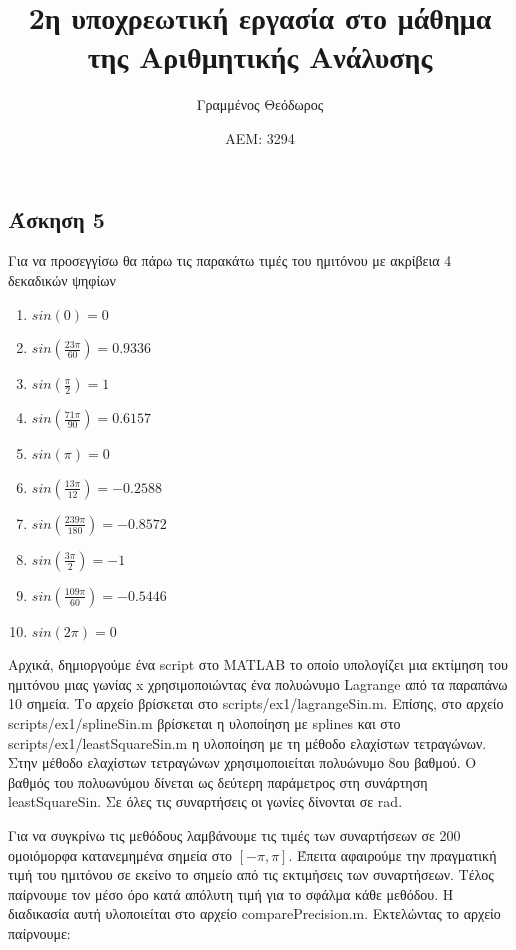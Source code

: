 \documentclass[12pt,a4paper]{article}
\author{Γραμμένος Θεόδωρος}
\title{2η υποχρεωτική εργασία στο μάθημα της Αριθμητικής Ανάλυσης}
\date{ΑΕΜ: 3294}
\begin{document}
\maketitle
\subsection*{Άσκηση 5}
Για να προσεγγίσω θα πάρω τις παρακάτω τιμές του ημιτόνου με ακρίβεια 4 δεκαδικών ψηφίων
\begin{enumerate}
    \item $sin(0) = 0$
    \item $sin(\frac{23\pi}{60}) = 0.9336$
    \item $sin(\frac{\pi}{2}) = 1$
    \item $sin(\frac{71\pi}{90}) = 0.6157$
    \item $sin(\pi) = 0$
    \item $sin(\frac{13\pi}{12}) = -0.2588$
    \item $sin(\frac{239\pi}{180}) = -0.8572$
    \item $sin(\frac{3\pi}{2}) = -1$
    \item $sin(\frac{109\pi}{60}) = -0.5446$
    \item $sin(2\pi) = 0$
\end{enumerate}
Αρχικά, δημιοργούμε ένα script στο MATLAB το οποίο υπολογίζει μια εκτίμηση του ημιτόνου μιας γωνίας x χρησιμοποιώντας 
ένα πολυώνυμο Lagrange από τα παραπάνω 10 σημεία. Το αρχείο βρίσκεται στο scripts/ex1/lagrangeSin.m. Επίσης, στο αρχείο 
scripts/ex1/splineSin.m βρίσκεται η υλοποίηση με splines και στο scripts/ex1/leastSquareSin.m η υλοποίηση με τη μέθοδο ελαχίστων 
τετραγώνων. Στην μέθοδο ελαχίστων τετραγώνων χρησιμοποιείται πολυώνυμο 8ου βαθμού. Ο βαθμός του πολυωνύμου δίνεται ως δεύτερη 
παράμετρος στη συνάρτηση leastSquareSin. Σε όλες τις συναρτήσεις οι γωνίες δίνονται σε rad.\par
Για να συγκρίνω τις μεθόδους λαμβάνουμε τις τιμές των συναρτήσεων σε 200 ομοιόμορφα κατανεμημένα σημεία στο $[-\pi,\pi]$. Έπειτα 
αφαιρούμε την πραγματική τιμή του ημιτόνου σε εκείνο το σημείο από τις εκτιμήσεις των συναρτήσεων. Τέλος παίρνουμε τον μέσο όρο κατά 
απόλυτη τιμή για το σφάλμα κάθε μεθόδου. Η διαδικασία αυτή υλοποιείται στο αρχείο comparePrecision.m. Εκτελώντας το αρχείο 
παίρνουμε:\par
\end{document}
